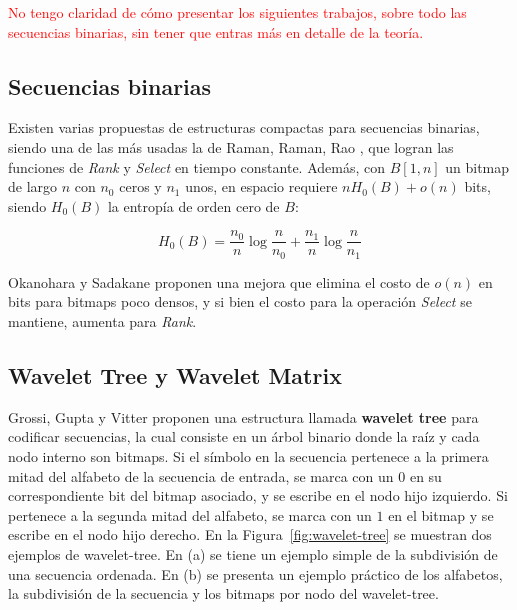 \textcolor{red}{No tengo claridad de cómo presentar los siguientes trabajos, sobre todo las secuencias binarias, sin tener que entras más en detalle de la teoría.}

\subsection{Secuencias binarias}
Existen varias propuestas de estructuras compactas para secuencias binarias, siendo una de las más usadas la de Raman, Raman, Rao \cite{raman2002succinct}, que logran las funciones de \textit{Rank} y \textit{Select} en tiempo constante. Además, con $B[1, n]$ un bitmap de largo $n$ con $n_{0}$ ceros y $n_{1}$ unos, en espacio requiere $nH_{0}(B) + o(n)$ bits, siendo $H_{0}(B)$ la entropía de orden cero de $B$: 

\begin{equation}
	H_{0}(B) = \frac{n_{0}}{n} \log\frac{n}{n_{0}} + \frac{n_{1}}{n} \log\frac{n}{n_{1}}
\end{equation}

Okanohara y Sadakane \cite{DBLP:journals/corr/abs-cs-0610001} proponen una mejora que elimina el costo de $o(n)$ en bits para bitmaps poco densos, y si bien el costo para la operación \textit{Select} se mantiene, aumenta para \textit{Rank}.


\subsection{Wavelet Tree y Wavelet Matrix}
Grossi, Gupta y Vitter \cite{grossi2003high} proponen una estructura llamada \textbf{wavelet tree} para codificar secuencias, la cual consiste en un árbol binario donde la raíz y cada nodo interno son bitmaps. Si el símbolo en la secuencia pertenece a la primera mitad del alfabeto de la secuencia de entrada, se marca con un $0$ en su correspondiente bit del bitmap asociado, y se escribe en el nodo hijo izquierdo. Si pertenece a la segunda mitad del alfabeto, se marca con un $1$ en el bitmap y se escribe en el nodo hijo derecho. En la Figura~\ref{fig:wavelet-tree} se muestran dos ejemplos de wavelet-tree. En (a) se tiene un ejemplo simple de la subdivisión de una secuencia ordenada. En (b) se presenta un ejemplo práctico de los alfabetos, la subdivisión de la secuencia y los bitmaps por nodo del wavelet-tree.



